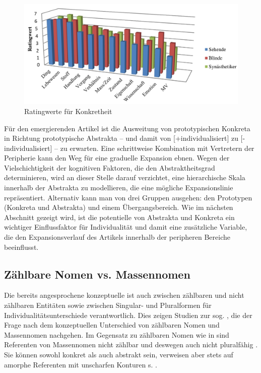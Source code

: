 \begin{figure}
\begin{center}
\includegraphics[width=12cm]{images/rating-konkret-abstrakt-schrauf-neu.jpg}
\caption {Ratingwerte für Konkretheit \parencite[][162]{Schrauf2011}}
\label{abb:schrauf-rating}
\end{center}
\end{figure}

Für den emergierenden Artikel ist die Ausweitung von prototypischen Konkreta in Richtung prototypische Abstrakta -- und damit von [+individualisiert] zu [-individualisiert] -- zu erwarten. Eine schrittweise Kombination mit Vertretern der Peripherie kann den Weg für eine graduelle Expansion ebnen. Wegen der Vielschichtigkeit der kognitiven Faktoren, die den Abstraktheitsgrad determinieren, wird an dieser Stelle darauf verzichtet, eine hierarchische Skala innerhalb der  Abstrakta zu modellieren, die eine mögliche Expansionslinie repräsentiert. Alternativ kann man von drei Gruppen ausgehen: den Prototypen (Konkreta und Abstrakta) und einem Übergangsbereich. Wie im nächsten Abschnitt gezeigt wird, ist die potentielle  von Abstrakta und Konkreta ein wichtiger Einflussfaktor für Individualität und damit eine zusätzliche Variable, die den Expansionsverlauf des Artikels innerhalb der peripheren Bereiche beeinflusst.  

\subsection{Zählbare Nomen vs. Massennomen}\label{section:mass}

Die bereits angesprochene konzeptuelle  ist auch zwischen zählbaren und nicht zählbaren Entitäten sowie zwischen Singular- und Pluralformen für Individualitätsunterschiede verantwortlich. Dies zeigen Studien zur sog.  \parencite[s.][]{Jackendoff1991, Langacker1991, Bisle-Muller1991, Rijkhoff1991,Rijkhoff2002, Corbett2000, Massam2012,Zifonun2012}, die der Frage nach dem konzeptuellen Unterschied von zählbaren Nomen und Massennomen nachgehen. Im Gegensatz zu zählbaren Nomen wie in  sind Referenten von Massennomen nicht zählbar und deswegen auch nicht pluralfähig \parencite[77]{Langacker1991}. Sie können sowohl konkret als auch abstrakt sein, verweisen aber stets auf amorphe Referenten mit unscharfen Konturen s. . 

